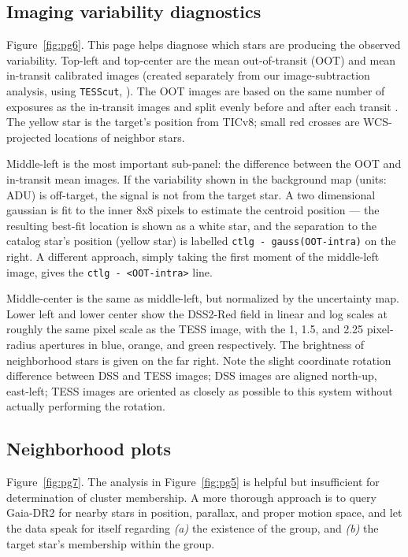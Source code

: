 \documentclass[12pt,twocolumn,tighten]{aastex62}
\begin{document}
\subsection{Imaging variability diagnostics}
\label{sec:pg6}

Figure~\ref{fig:pg6}.
This page helps diagnose which stars are producing the observed
variability.  Top-left and top-center are the mean out-of-transit
(OOT) and mean in-transit calibrated images (created separately from our
image-subtraction analysis, using \texttt{TESScut},
\citealt{brasseur_astrocut_2019}).  The OOT images are based on the same
number of exposures as the in-transit images and split evenly before
and after each transit
\citep[following][]{bryson_identification_2013,kostov_l9859_2019}.
The yellow star is the target's position from TICv8; 
small red crosses are WCS-projected locations of neighbor stars.

Middle-left is the most important sub-panel: the difference between
the OOT and in-transit mean images.
If the variability shown in the background map (units: ADU) is off-target,
the signal is not from the target star.  
A two dimensional gaussian is fit to the inner 8x8 pixels to estimate
the centroid position --- the resulting best-fit location is shown as
a white star, and the separation to the catalog star's position
(yellow star) is labelled \texttt{ctlg - gauss(OOT-intra)} on the
right.
A different approach, simply taking the first moment of the middle-left
image, gives the \texttt{ctlg - <OOT-intra>} line.

Middle-center is the same as middle-left, but normalized by the
uncertainty map.  Lower left and lower center show the DSS2-Red field
in linear and log scales at roughly the same pixel scale as the TESS
image, with the 1, 1.5, and 2.25 pixel-radius apertures in blue,
orange, and green respectively.  The brightness of neighborhood stars
is given on the far right.  Note the slight coordinate rotation
difference between DSS and TESS images; DSS images are aligned
north-up, east-left; TESS images are oriented as closely as possible
to this system without actually performing the rotation.

\subsection{Neighborhood plots}
\label{sec:pg7}

Figure~\ref{fig:pg7}.
The analysis in Figure~\ref{fig:pg5} is helpful but insufficient for
determination of cluster membership.
A more thorough approach is to query Gaia-DR2 for
nearby stars in position, parallax, and proper motion space, and
let the data speak for itself regarding {\it (a)} the existence of
the group, and {\it (b)} the target star's membership within the group.
\end{document}
